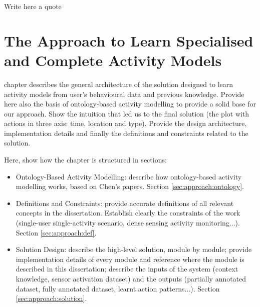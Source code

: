 

\begin{savequote}[50mm]
Write here a quote
\end{savequote}


\chapter{The Approach to Learn Specialised and Complete Activity Models}
\label{cha:archi}

\ifpdf
    \graphicspath{{3_approach_to_learning_eam/figures/PDF/}{3_approach_to_learning_eam/figures/PNG/}{3_approach_to_learning_eam/figures/}}
\else
    \graphicspath{{3_approach_to_learning_eam/figures/EPS/}{3_approach_to_learning_eam/figures/}}
\fi

 chapter describes the general architecture of the solution designed to learn activity models from user's behavioural data and previous knowledge. Provide here also the basis of ontology-based activity modelling to provide a solid base for our approach. Show the intuition that led us to the final solution (the plot with actions in three axis: time, location and type). Provide the design architecture, implementation details and finally the definitions and constraints related to the solution.

Here, show how the chapter is structured in sections:

\begin{itemize}
 \item Ontology-Based Activity Modelling: describe how ontology-based activity modelling works, based on Chen's papers. Section \ref{sec:approach:ontology}.
 \item Definitions and Constraints: provide accurate definitions of all relevant concepts in the dissertation. Establish clearly the constraints of the work (single-user single-activity scenario, dense sensing activity monitoring...). Section \ref{sec:approach:def}.
 \item Solution Design: describe the high-level solution, module by module; provide implementation details of every module and reference where the module is described in this dissertation; describe the inputs of the system (context knowledge, sensor activation dataset) and the outputs (partially annotated dataset, fully annotated dataset, learnt action patterns...). Section \ref{sec:approach:solution}.
\end{itemize}

